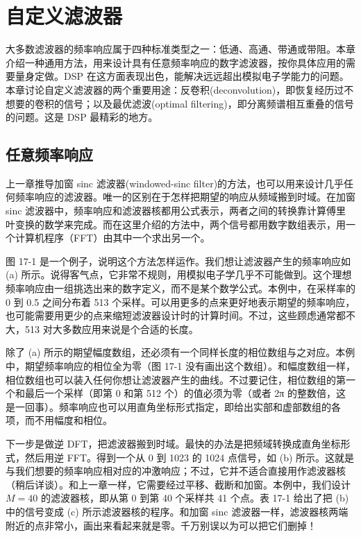 
\chapter{自定义滤波器}\label{ch-17}

大多数滤波器的频率响应属于四种标准类型之一：低通、高通、带通或带阻。本章介绍一种通用方法，用来设计具有任意频率响应的数字滤波器，按你具体应用的需要量身定做。DSP
在这方面表现出色，能解决远远超出模拟电子学能力的问题。本章讨论自定义滤波器的两个重要用途：反卷积(deconvolution)，即恢复经历过不想要的卷积的信号；以及最优滤波(optimal
filtering)，即分离频谱相互重叠的信号的问题。这是 DSP 最精彩的地方。

\section{任意频率响应}

上一章推导加窗 sinc 滤波器(windowed-sinc
filter)的方法，也可以用来设计几乎任何频率响应的滤波器。唯一的区别在于怎样把期望的响应从频域搬到时域。在加窗
sinc
滤波器中，频率响应和滤波器核都用公式表示，两者之间的转换靠计算傅里叶变换的数学来完成。而在这里介绍的方法中，两个信号都用数字数组表示，用一个计算机程序（FFT）由其中一个求出另一个。

图 17-1 是一个例子，说明这个方法怎样运作。我们想让滤波器产生的频率响应如
(a)
所示。说得客气点，它非常不规则，用模拟电子学几乎不可能做到。这个理想频率响应由一组挑选出来的数字定义，而不是某个数学公式。本例中，在采样率的
0 到 0.5 之间分布着 513
个采样。可以用更多的点来更好地表示期望的频率响应，也可能需要用更少的点来缩短滤波器设计时的计算时间。不过，这些顾虑通常都不大，513
对大多数应用来说是个合适的长度。

除了 (a)
所示的期望幅度数组，还必须有一个同样长度的相位数组与之对应。本例中，期望频率响应的相位全为零（图
17-1
没有画出这个数组）。和幅度数组一样，相位数组也可以装入任何你想让滤波器产生的曲线。不过要记住，相位数组的第一个和最后一个采样（即第
0 和第 512 个）的值必须为零（或者 2π
的整数倍，这是一回事）。频率响应也可以用直角坐标形式指定，即给出实部和虚部数组的各项，而不用幅度和相位。

下一步是做逆
DFT，把滤波器搬到时域。最快的办法是把频域转换成直角坐标形式，然后用逆
FFT。得到一个从 0 到 1023 的 1024 点信号，如 (b)
所示。这就是与我们想要的频率响应相对应的冲激响应；不过，它并不适合直接用作滤波器核（稍后详谈）。和上一章一样，它需要经过平移、截断和加窗。本例中，我们设计
\(M = 40\) 的滤波器核，即从第 0 到第 40 个采样共 41 个点。表 17-1
给出了把 (b) 中的信号变成 (c) 所示滤波器核的程序。和加窗 sinc
滤波器一样，滤波器核两端附近的点非常小，画出来看起来就是零。千万别误以为可以把它们删掉！

